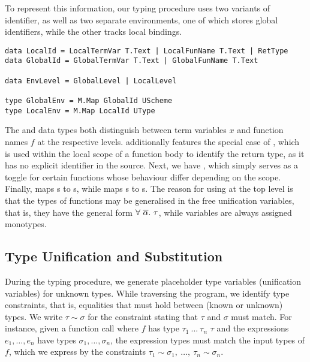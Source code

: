 To represent this information, our typing procedure uses two variants of
identifier, as well as two separate environments, one of which stores global
identifiers, while the other tracks local bindings.

\begin{verbatim}
data LocalId = LocalTermVar T.Text | LocalFunName T.Text | RetType
data GlobalId = GlobalTermVar T.Text | GlobalFunName T.Text

data EnvLevel = GlobalLevel | LocalLevel

type GlobalEnv = M.Map GlobalId UScheme
type LocalEnv = M.Map LocalId UType
\end{verbatim}

The  and  data types both distinguish between
term variables $x$ and function names $f$ at the respective levels.
 additionally features the special case of ,
which is used within the local scope of a function body to identify the return
type, as it has no explicit identifier in the source.
Next, we have , which simply serves as a toggle for certain
functions whose behaviour differ depending on the scope.
Finally,  maps s to s,
while  maps s to s.
The reason for using  at the top level is that the types of
functions may be generalised in the free unification variables, that is, they
have the general form $\forall\ \set{\alpha}.\ \tau$, while variables are always
assigned monotypes.


\subsection{Type Unification and Substitution} \label{sec:unification-substitution}

During the typing procedure, we generate placeholder type variables (unification
variables) for unknown types. While traversing the program, we identify type
constraints, that is, equalities that must hold between (known or unknown) types.
We write $\tau \sim \sigma$ for the constraint stating that $\tau$ and $\sigma$
must match. For instance, given a function call 
where $f$ has type $\tau_1\ ...\ \tau_n$ \spl{->} $\tau$ and the expressions
$e_1,\dots,e_n$ have types $\sigma_1,\dots,\sigma_n$, the expression types must
match the input types of $f$, which we express by the constraints $\tau_1 \sim
\sigma_1,\ \dots,\ \tau_n \sim \sigma_n$.

